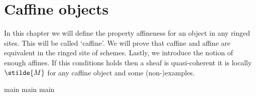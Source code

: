 \chapter{Caffine objects}

In this chapter we will define the property affineness for an object in any ringed sites.
This will be called `caffine'. We will prove that caffine and affine are equivalent in the ringed site of schemes.
Lastly, we introduce the notion of enough affines.
If this conditions holds then a sheaf is quasi-coherent \iff it is locally $\stilde{M}$ for any caffine object and some (non-)examples.


{main}
{main}
{main}